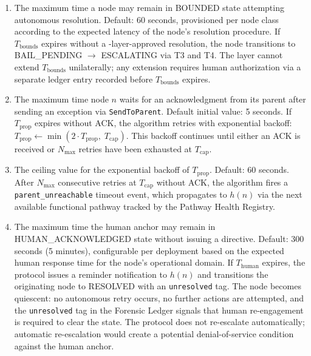 \begin{enumerate}
\item[\textbf{$T_{\text{bounds}}$ — Bounds Engine resolution timeout.}] The maximum time a node may remain in BOUNDED state attempting autonomous resolution. Default: 60 seconds, provisioned per node class according to the expected latency of the node's resolution procedure. If $T_{\text{bounds}}$ expires without a \fact-layer-approved resolution, the node transitions to BAIL\_PENDING $\rightarrow$ ESCALATING via T3 and T4. The \fact{} layer cannot extend $T_{\text{bounds}}$ unilaterally; any extension requires human authorization via a separate ledger entry recorded before $T_{\text{bounds}}$ expires.

\item[\textbf{$T_{\text{prop}}$ — Per-hop propagation timeout.}] The maximum time node $n$ waits for an acknowledgment from its parent after sending an exception via \texttt{SendToParent}. Default initial value: 5 seconds. If $T_{\text{prop}}$ expires without ACK, the algorithm retries with exponential backoff: $T_{\text{prop}} \leftarrow \min(2 \cdot T_{\text{prop}},\; T_{\text{cap}})$. This backoff continues until either an ACK is received or $N_{\max}$ retries have been exhausted at $T_{\text{cap}}$.

\item[\textbf{$T_{\text{cap}}$ — Maximum propagation timeout value.}] The ceiling value for the exponential backoff of $T_{\text{prop}}$. Default: 60 seconds. After $N_{\max}$ consecutive retries at $T_{\text{cap}}$ without ACK, the algorithm fires a \texttt{parent\_unreachable} timeout event, which propagates to $h(n)$ via the next available functional pathway tracked by the Pathway Health Registry.

\item[\textbf{$T_{\text{human}}$ — Human acknowledgment timeout.}] The maximum time the human anchor may remain in HUMAN\_ACKNOWLEDGED state without issuing a directive. Default: 300 seconds (5 minutes), configurable per deployment based on the expected human response time for the node's operational domain. If $T_{\text{human}}$ expires, the protocol issues a reminder notification to $h(n)$ and transitions the originating node to RESOLVED with an \texttt{unresolved} tag. The node becomes quiescent: no autonomous retry occurs, no further actions are attempted, and the \texttt{unresolved} tag in the Forensic Ledger signals that human re-engagement is required to clear the state. The protocol does not re-escalate automatically; automatic re-escalation would create a potential denial-of-service condition against the human anchor.
\end{enumerate}

